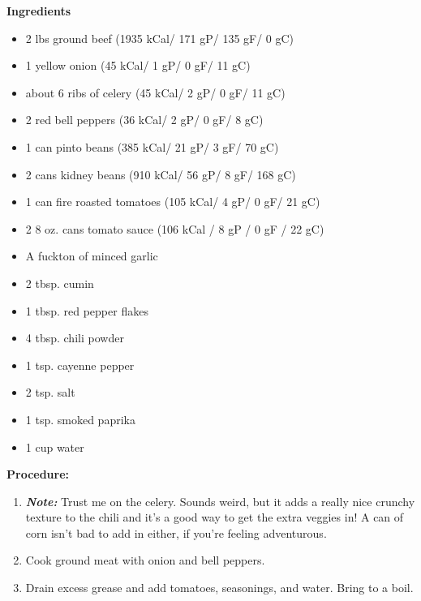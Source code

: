 \documentclass{report}
\begin{document}


\bigskip

\bigskip

\begin{multicols}{2}
\textbf{Ingredients}
\begin{itemize}
\item 2 lbs ground beef \quad (1935 kCal/ 171 gP/ 135 gF/ 0 gC)
\item 1 yellow onion \quad (45 kCal/ 1 gP/ 0 gF/ 11 gC)
\item about 6 ribs of celery \quad (45 kCal/ 2 gP/ 0 gF/ 11 gC)
\item 2 red bell peppers  \quad (36 kCal/ 2 gP/ 0 gF/ 8 gC)
\item 1 can pinto beans \quad (385 kCal/ 21 gP/ 3 gF/ 70 gC)
\item 2 cans kidney beans \quad (910 kCal/ 56 gP/ 8 gF/ 168 gC)
\item 1 can fire roasted tomatoes \newline   (105 kCal/ 4 gP/ 0 gF/ 21 gC)
\item 2 8 oz. cans tomato sauce \newline (106 kCal / 8 gP / 0 gF / 22 gC)
\item A fuckton of minced garlic
\item 2 tbsp. cumin
\item 1 tbsp. red pepper flakes
\item 4 tbsp. chili powder
\item 1 tsp. cayenne pepper
\item 2 tsp. salt
\item 1 tsp. smoked paprika
\item 1 cup water 



\end{itemize}


\columnbreak
\textbf{Procedure:}

\begin{enumerate}
\item \textit{\textbf{Note:}} Trust me on the celery. Sounds weird, but it adds a really nice crunchy texture to the chili and it's a good way to get the extra veggies in! A can of corn isn't bad to add in either, if you're feeling adventurous.
\item Cook ground meat with onion and bell peppers. 

\item Drain excess grease and add tomatoes, seasonings, and water. Bring to a boil. 


\end{enumerate}
\end{multicols}
\end{document}
